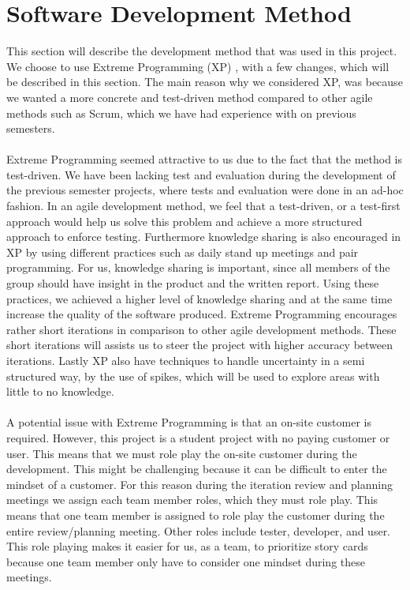
\section{Software Development Method}
\label{sec:software_development_method}

This section will describe the development method that was used in this project. We choose to use Extreme Programming (XP) \parencite{xp}, with a few changes, which will be described in this section. The main reason why we considered XP, was because we wanted a more concrete and test-driven method compared to other agile methods such as Scrum, which we have had experience with on previous semesters.
\\\\
Extreme Programming seemed attractive to us due to the fact that the method is test-driven. We have been lacking test and evaluation during the development of the previous semester projects, where tests and evaluation were done in an ad-hoc fashion. In an agile development method, we feel that a test-driven, or a test-first approach would help us solve this problem and achieve a more structured approach to enforce testing. Furthermore knowledge sharing is also encouraged in XP by using different practices such as daily stand up meetings and pair programming. For us, knowledge sharing is important, since all members of the group should have insight in the product and the written report. Using these practices, we achieved a higher level of knowledge sharing and at the same time increase the quality of the software produced. Extreme Programming encourages rather short iterations in comparison to other agile development methods. These short iterations will assists us to steer the project with higher accuracy between iterations. Lastly XP also have techniques to handle uncertainty in a semi structured way, by the use of spikes, which will be used to explore areas with little to no knowledge. 
\\\\
A potential issue with Extreme Programming is that an on-site customer is required. However, this project is a student project with no paying customer or user. This means that we must role play the on-site customer during the development. This might be challenging because it can be difficult to enter the mindset of a customer. For this reason during the iteration review and planning meetings we assign each team member roles, which they must role play. This means that one team member is assigned to role play the customer during the entire review/planning meeting. Other roles include tester, developer, and user. This role playing makes it easier for us, as a team, to prioritize story cards because one team member only have to consider one mindset during these meetings.
